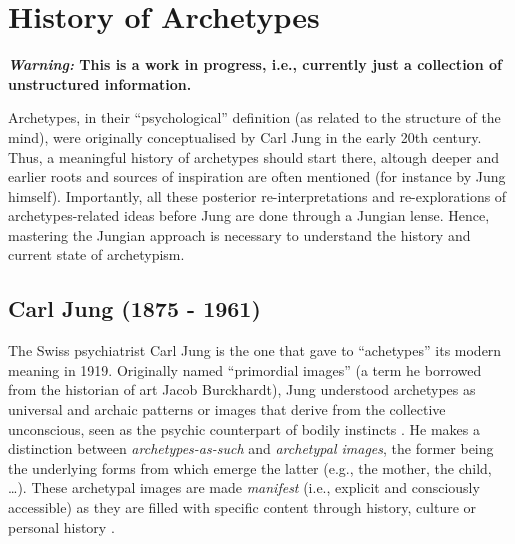 \documentclass[]{book}
\begin{document}
\hypertarget{history-of-archetypes}{%
\chapter{History of Archetypes}\label{history-of-archetypes}}

\textbf{\emph{Warning:} This is a work in progress, i.e., currently just a collection of unstructured information.}

Archetypes, in their ``psychological'' definition (as related to the structure of the mind), were originally conceptualised by Carl Jung in the early 20th century. Thus, a meaningful history of archetypes should start there, altough deeper and earlier roots and sources of inspiration are often mentioned (for instance by Jung himself). Importantly, all these posterior re-interpretations and re-explorations of archetypes-related ideas before Jung are done through a Jungian lense. Hence, mastering the Jungian approach is necessary to understand the history and current state of archetypism.

\hypertarget{carl-jung-1875---1961}{%
\section{Carl Jung (1875 - 1961)}\label{carl-jung-1875---1961}}

The Swiss psychiatrist Carl Jung is the one that gave to ``achetypes'' its modern meaning in 1919. Originally named ``primordial images'' (a term he borrowed from the historian of art Jacob Burckhardt), Jung understood archetypes as universal and archaic patterns or images that derive from the collective unconscious, seen as the psychic counterpart of bodily instincts \citep{feist2009theories}. He makes a distinction between \emph{archetypes-as-such} and \emph{archetypal images}, the former being the underlying forms from which emerge the latter (e.g., the mother, the child, \ldots). These archetypal images are made \emph{manifest} (i.e., explicit and consciously accessible) as they are filled with specific content through history, culture or personal history \citep{papadopoulos2012}.
\end{document}
